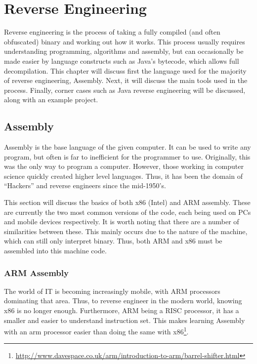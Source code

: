 \chapter{Reverse Engineering}
	\label{ch:ReverseEngineering}
	Reverse engineering is the process of taking a fully compiled (and often obfuscated) binary and working out how it works.
	This process usually requires understanding programming, algorithms and assembly, but can occasionally be made easier by language constructs such as Java's bytecode, which allows full decompilation.
	This chapter will discuss first the language used for the majority of reverse engineering, Assembly.
	Next, it will discuss the main tools used in the process.
	Finally, corner cases such as Java reverse engineering will be discussed, along with an example project.

	\section{Assembly}
		Assembly is the base language of the given computer.
		It can be used to write any program, but often is far to inefficient for the programmer to use.
		Originally, this was the only way to program a computer.
		However, those working in computer science quickly created higher level languages.
		Thus, it has been the domain of ``Hackers'' and reverse engineers since the mid-1950's.

		This section will discuss the basics of both x86 (Intel) and ARM assembly.
		These are currently the two most common versions of the code, each being used on PCs and mobile devices respectively.
		It is worth noting that there are a number of similarities between these.
		This mainly occurs due to the nature of the machine, which can still only interpret binary.
		Thus, both ARM and x86 must be assembled into this machine code.
		\subsection{ARM Assembly}
			The world of IT is becoming increasingly mobile, with ARM processors dominating that area.
			Thus, to reverse engineer in the modern world, knowing x86 is no longer enough.
			Furthermore, ARM being a RISC processor, it has a smaller and easier to understand instruction set.
			This makes learning Assembly with an arm processor easier than doing the same with x86\footnote{\url{http://www.davespace.co.uk/arm/introduction-to-arm/barrel-shifter.html}}.

